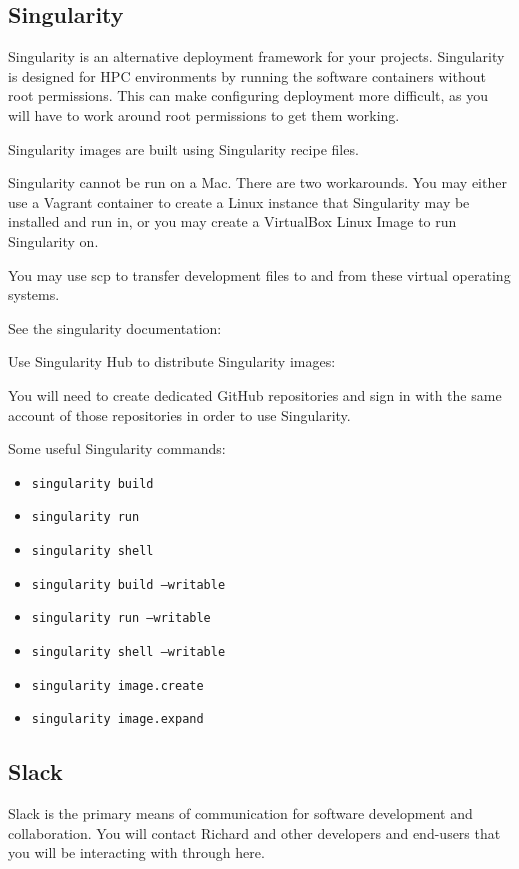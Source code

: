 \documentclass{article}
\begin{document}
\subsection{Singularity}

Singularity is an alternative deployment framework for your projects.
Singularity is designed for HPC environments by running the 
software containers without root permissions. 
This can make configuring deployment more difficult, as
you will have to work around root permissions to get them working.

Singularity images are built using Singularity recipe files.

Singularity cannot be run on a Mac.
There are two workarounds.
You may either use a Vagrant container to create a Linux
instance that Singularity may be installed 
and run in, or you may create a VirtualBox Linux Image
to run Singularity on.

You may use scp to transfer development files to and from these 
virtual operating systems.

See the singularity documentation:


Use Singularity Hub to distribute Singularity images:


You will need to create dedicated GitHub repositories and sign in
with the same account of those repositories in order to use 
Singularity.


Some useful Singularity commands:

\begin{itemize}
\item \texttt{singularity build}
\item \texttt{singularity run}
\item \texttt{singularity shell}
\item \texttt{singularity build --writable}
\item \texttt{singularity run --writable}
\item \texttt{singularity shell --writable}
\item \texttt{singularity image.create}
\item \texttt{singularity image.expand}
\end{itemize}


\subsection{Slack}

Slack is the primary means of communication for software development
and collaboration.
You will contact Richard and other developers and end-users that 
you will be interacting with through here.
\end{document}
